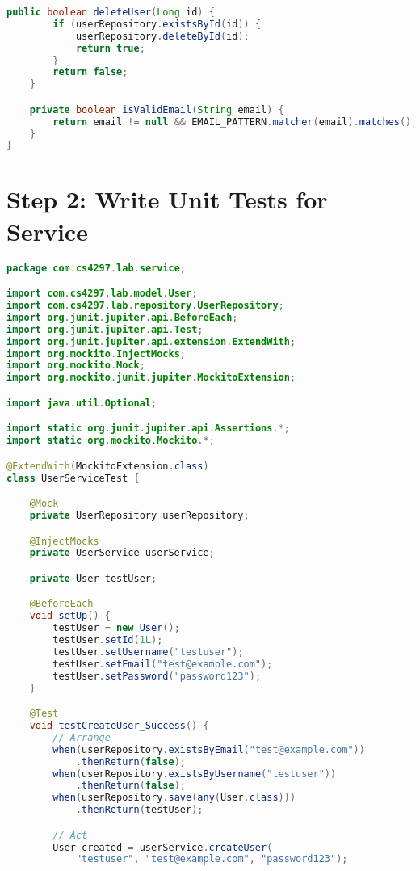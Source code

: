 \documentclass[12pt,a4paper]{article}
\begin{document}
\begin{lstlisting}[language=java, caption=UserService.java - Business Logic Layer]
    public boolean deleteUser(Long id) {
        if (userRepository.existsById(id)) {
            userRepository.deleteById(id);
            return true;
        }
        return false;
    }

    private boolean isValidEmail(String email) {
        return email != null && EMAIL_PATTERN.matcher(email).matches();
    }
}
\end{lstlisting}

\section{Step 2: Write Unit Tests for Service}

\begin{lstlisting}[language=java, caption=UserServiceTest.java - Unit Tests with Mockito]
package com.cs4297.lab.service;

import com.cs4297.lab.model.User;
import com.cs4297.lab.repository.UserRepository;
import org.junit.jupiter.api.BeforeEach;
import org.junit.jupiter.api.Test;
import org.junit.jupiter.api.extension.ExtendWith;
import org.mockito.InjectMocks;
import org.mockito.Mock;
import org.mockito.junit.jupiter.MockitoExtension;

import java.util.Optional;

import static org.junit.jupiter.api.Assertions.*;
import static org.mockito.Mockito.*;

@ExtendWith(MockitoExtension.class)
class UserServiceTest {

    @Mock
    private UserRepository userRepository;

    @InjectMocks
    private UserService userService;

    private User testUser;

    @BeforeEach
    void setUp() {
        testUser = new User();
        testUser.setId(1L);
        testUser.setUsername("testuser");
        testUser.setEmail("test@example.com");
        testUser.setPassword("password123");
    }

    @Test
    void testCreateUser_Success() {
        // Arrange
        when(userRepository.existsByEmail("test@example.com"))
            .thenReturn(false);
        when(userRepository.existsByUsername("testuser"))
            .thenReturn(false);
        when(userRepository.save(any(User.class)))
            .thenReturn(testUser);

        // Act
        User created = userService.createUser(
            "testuser", "test@example.com", "password123");


\end{lstlisting}
\end{document}
